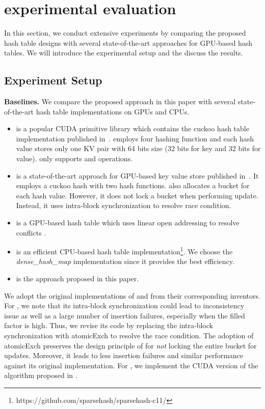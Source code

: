 \section{experimental evaluation}\label{sec:exp}
In this section, we conduct extensive experiments by comparing the proposed hash table designs with several state-of-the-art approaches for GPU-based hash tables. 
We will introduce the experimental setup and the discuss the results. 

\subsection{Experiment Setup}

\vspace{1mm}\noindent\textbf{Baselines.} We compare the proposed approach in this paper with several state-of-the-art hash table implementations on GPUs and CPUs. 
\begin{itemize}
	\item \cudpp is a popular CUDA primitive library which contains the cuckoo hash table implementation published in~\cite{alcantara2009real}. 
	\cudpp employs four hashing function and each hash value stores only one KV pair with 64 bits size (32 bits for key and 32 bits for value). 
	\cudpp only supports  and  operations. 
	\item \megakv is a state-of-the-art approach for GPU-based key value store published in~\cite{zhang2015mega}. It employs a cuckoo hash with two hash functions.
	\megakv also allocates a bucket for each hash value. However, it does not lock a bucket when performing update. Instead, it uses intra-block synchronization to resolve race condition. 
	\item \linear is a GPU-based hash table which uses linear open addressing to resolve conflicts \cite{hong2010mapcg}. 
	\item \google is an efficient CPU-based hash table implementation\footnote{https://github.com/sparsehash/sparsehash-c11/}. We choose the \emph{dense\_hash\_map} implementation since it provides the best efficiency.
	\item \voter is the approach proposed in this paper.
\end{itemize}
We adopt the original implementations of \cudpp and \google from their corresponding inventors. 
For \megakv, we note that its intra-block synchronization could lead to inconsistency issue as well as a large number of insertion failures, especially when the filled factor is high.  
Thus, we revise its code by replacing the intra-block synchronization with atomicExch to resolve the race condition. The adoption of atomicExch preserves the design principle of \megakv for \emph{not} locking the entire bucket for updates. Moreover, it leads to less insertion failures and similar performance against its original implementation. 
For \linear, we implement the CUDA version of the algorithm proposed in \cite{hong2010mapcg}.

